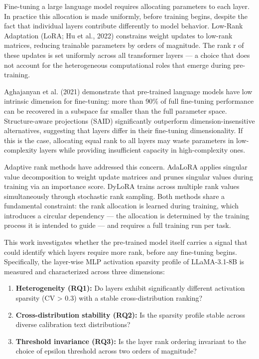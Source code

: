 
Fine-tuning a large language model requires allocating parameters to each layer. In practice this allocation is made uniformly, before training begins, despite the fact that individual layers contribute differently to model behavior. Low-Rank Adaptation (LoRA; Hu et al., 2022) constrains weight updates to low-rank matrices, reducing trainable parameters by orders of magnitude. The rank r of these updates is set uniformly across all transformer layers --- a choice that does not account for the heterogeneous computational roles that emerge during pre-training.

Aghajanyan et al. (2021) demonstrate that pre-trained language models have low intrinsic dimension for fine-tuning: more than 90\% of full fine-tuning performance can be recovered in a subspace far smaller than the full parameter space. Structure-aware projections (SAID) significantly outperform dimension-insensitive alternatives, suggesting that layers differ in their fine-tuning dimensionality. If this is the case, allocating equal rank to all layers may waste parameters in low-complexity layers while providing insufficient capacity in high-complexity ones.

Adaptive rank methods have addressed this concern. AdaLoRA \citep{zhang2023adalora} applies singular value decomposition to weight update matrices and prunes singular values during training via an importance score. DyLoRA \citep{valipour2022dylora} trains across multiple rank values simultaneously through stochastic rank sampling. Both methods share a fundamental constraint: the rank allocation is learned during training, which introduces a circular dependency --- the allocation is determined by the training process it is intended to guide --- and requires a full training run per task.

This work investigates whether the pre-trained model itself carries a signal that could identify which layers require more rank, before any fine-tuning begins. Specifically, the layer-wise MLP activation sparsity profile of LLaMA-3.1-8B is measured and characterized across three dimensions:

\begin{enumerate}
\item \textbf{Heterogeneity (RQ1):} Do layers exhibit significantly different activation sparsity (CV > 0.3) with a stable cross-distribution ranking?
\item \textbf{Cross-distribution stability (RQ2):} Is the sparsity profile stable across diverse calibration text distributions?
\item \textbf{Threshold invariance (RQ3):} Is the layer rank ordering invariant to the choice of epsilon threshold across two orders of magnitude?
\end{enumerate}

